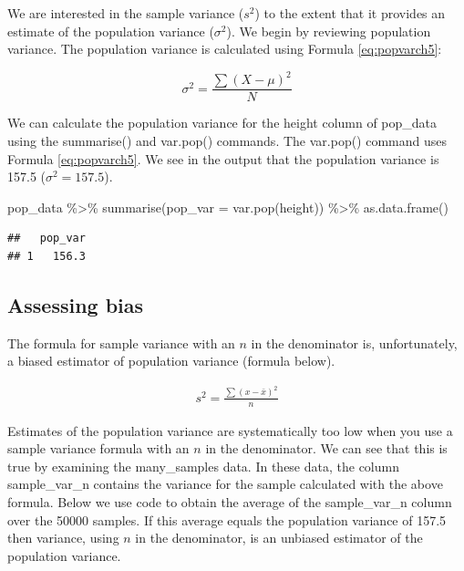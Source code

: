 \documentclass[
]{krantz}
\makeatletter
\newenvironment{Shaded}{\begin{snugshade}}{\end{snugshade}}
\newcommand{\AttributeTok}[1]{\textcolor[rgb]{0.61,0.61,0.61}{#1}}
\newcommand{\FunctionTok}[1]{\textcolor[rgb]{0,0,0}{#1}}
\newcommand{\NormalTok}[1]{#1}
\newcommand{\SpecialCharTok}[1]{\textcolor[rgb]{0,0,0}{#1}}
\newenvironment{kframe}{%
\medskip{}
\setlength{\fboxsep}{.8em}
 \def\at@end@of@kframe{}%
 \ifinner\ifhmode%
  \def\at@end@of@kframe{\end{minipage}}%
  \begin{minipage}{\columnwidth}%
 \fi\fi%
 \def\FrameCommand##1{\hskip\@totalleftmargin \hskip-\fboxsep
 \colorbox{shadecolor}{##1}\hskip-\fboxsep
     \hskip-\linewidth \hskip-\@totalleftmargin \hskip\columnwidth}%
 \MakeFramed {\advance\hsize-\width
   \@totalleftmargin\z@ \linewidth\hsize
   \@setminipage}}%
 {\par\unskip\endMakeFramed%
 \at@end@of@kframe}
\renewenvironment{Shaded}{\begin{kframe}}{\end{kframe}}
\makeatother
\begin{document}
We are interested in the sample variance (\(s^2\)) to the extent that it provides an estimate of the population variance (\(\sigma^2\)). We begin by reviewing population variance. The population variance is calculated using Formula \eqref{eq:popvarch5}:

\begin{equation} 
\sigma^2 = \frac{\sum{(X - \mu)^2}}{N}
      \label{eq:popvarch5}
\end{equation}

We can calculate the population variance for the height column of pop\_data using the summarise() and var.pop() commands. The var.pop() command uses Formula \eqref{eq:popvarch5}. We see in the output that the population variance is 157.5 (\(\sigma^2 = 157.5\)).

\begin{Shaded}
\begin{Highlighting}[]
\NormalTok{pop\_data }\SpecialCharTok{\%\textgreater{}\%}
  \FunctionTok{summarise}\NormalTok{(}\AttributeTok{pop\_var =} \FunctionTok{var.pop}\NormalTok{(height)) }\SpecialCharTok{\%\textgreater{}\%}
  \FunctionTok{as.data.frame}\NormalTok{()}
\end{Highlighting}
\end{Shaded}

\begin{verbatim}
##   pop_var
## 1   156.3
\end{verbatim}

\hypertarget{assessing-bias-1}{%
\subsection{Assessing bias}\label{assessing-bias-1}}

The formula for sample variance with an \(n\) in the denominator is, unfortunately, a biased estimator of population variance (formula below).

\[
\begin{aligned} 
s^2 = \frac{\sum{(x - \bar{x})^2}}{n}
\end{aligned} 
\]

Estimates of the population variance are systematically too low when you use a sample variance formula with an \(n\) in the denominator. We can see that this is true by examining the many\_samples data. In these data, the column sample\_var\_n contains the variance for the sample calculated with the above formula. Below we use code to obtain the average of the sample\_var\_n column over the 50000 samples. If this average equals the population variance of 157.5 then variance, using \(n\) in the denominator, is an unbiased estimator of the population variance.
\end{document}

